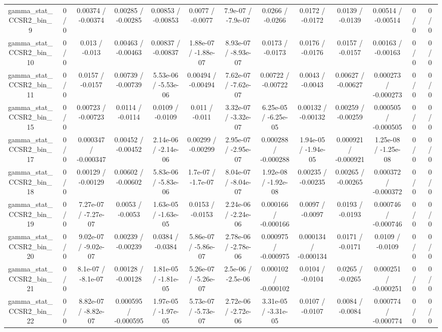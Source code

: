 \documentclass[10pt]{article}
\begin{document}
\begin{table}[htbp]
\begin{center}
\begin{tabular}{|c|c|c|c|c|c|c|c|c|c|c|c|c|}
  gamma_stat_CCSR2_bin_9 & 0 / 0 & 0.00374 / -0.00374 & 0.00285 / -0.00285 & 0.00853 / -0.00853 & 0.0077 / -0.0077 & 7.9e-07 / -7.9e-07 & 0.0266 / -0.0266 & 0.0172 / -0.0172 & 0.0139 / -0.0139 & 0.00514 / -0.00514 & 0 / 0 & 0 / 0 \\ 
  gamma_stat_CCSR2_bin_10 & 0 / 0 & 0.013 / -0.013 & 0.00463 / -0.00463 & 0.00837 / -0.00837 & 1.88e-07 / -1.88e-07 & 8.93e-07 / -8.93e-07 & 0.0173 / -0.0173 & 0.0176 / -0.0176 & 0.0157 / -0.0157 & 0.00163 / -0.00163 & 0 / 0 & 0 / 0 \\ 
  gamma_stat_CCSR2_bin_11 & 0 / 0 & 0.0157 / -0.0157 & 0.00739 / -0.00739 & 5.53e-06 / -5.53e-06 & 0.00494 / -0.00494 & 7.62e-07 / -7.62e-07 & 0.00722 / -0.00722 & 0.0043 / -0.0043 & 0.00627 / -0.00627 & 0.000273 / -0.000273 & 0 / 0 & 0 / 0 \\ 
  gamma_stat_CCSR2_bin_15 & 0 / 0 & 0.00723 / -0.00723 & 0.0114 / -0.0114 & 0.0109 / -0.0109 & 0.011 / -0.011 & 3.32e-07 / -3.32e-07 & 6.25e-05 / -6.25e-05 & 0.00132 / -0.00132 & 0.00259 / -0.00259 & 0.000505 / -0.000505 & 0 / 0 & 0 / 0 \\ 
  gamma_stat_CCSR2_bin_17 & 0 / 0 & 0.000347 / -0.000347 & 0.00452 / -0.00452 & 2.14e-06 / -2.14e-06 & 0.00299 / -0.00299 & 2.95e-07 / -2.95e-07 & 0.000288 / -0.000288 & 1.94e-05 / -1.94e-05 & 0.000921 / -0.000921 & 1.25e-08 / -1.25e-08 & 0 / 0 & 0 / 0 \\ 
  gamma_stat_CCSR2_bin_18 & 0 / 0 & 0.00129 / -0.00129 & 0.00602 / -0.00602 & 5.83e-06 / -5.83e-06 & 1.7e-07 / -1.7e-07 & 8.04e-07 / -8.04e-07 & 1.92e-08 / -1.92e-08 & 0.00235 / -0.00235 & 0.00265 / -0.00265 & 0.000372 / -0.000372 & 0 / 0 & 0 / 0 \\ 
  gamma_stat_CCSR2_bin_19 & 0 / 0 & 7.27e-07 / -7.27e-07 & 0.0053 / -0.0053 & 1.63e-05 / -1.63e-05 & 0.0153 / -0.0153 & 2.24e-06 / -2.24e-06 & 0.000166 / -0.000166 & 0.0097 / -0.0097 & 0.0193 / -0.0193 & 0.000746 / -0.000746 & 0 / 0 & 0 / 0 \\ 
  gamma_stat_CCSR2_bin_20 & 0 / 0 & 9.02e-07 / -9.02e-07 & 0.00239 / -0.00239 & 0.0384 / -0.0384 & 5.86e-07 / -5.86e-07 & 2.78e-06 / -2.78e-06 & 0.000975 / -0.000975 & 0.000134 / -0.000134 & 0.0171 / -0.0171 & 0.0109 / -0.0109 & 0 / 0 & 0 / 0 \\ 
  gamma_stat_CCSR2_bin_21 & 0 / 0 & 8.1e-07 / -8.1e-07 & 0.00128 / -0.00128 & 1.81e-05 / -1.81e-05 & 5.26e-07 / -5.26e-07 & 2.5e-06 / -2.5e-06 & 0.000102 / -0.000102 & 0.0104 / -0.0104 & 0.0265 / -0.0265 & 0.000251 / -0.000251 & 0 / 0 & 0 / 0 \\ 
  gamma_stat_CCSR2_bin_22 & 0 / 0 & 8.82e-07 / -8.82e-07 & 0.000595 / -0.000595 & 1.97e-05 / -1.97e-05 & 5.73e-07 / -5.73e-07 & 2.72e-06 / -2.72e-06 & 3.31e-05 / -3.31e-05 & 0.0107 / -0.0107 & 0.0084 / -0.0084 & 0.000774 / -0.000774 & 0 / 0 & 0 / 0 \\ 

\end{tabular}
\end{center}
\end{table}
\end{document}
